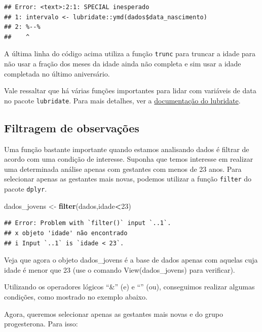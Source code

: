 \documentclass[
]{book}
\newenvironment{Shaded}{\begin{snugshade}}{\end{snugshade}}
\newcommand{\DecValTok}[1]{\textcolor[rgb]{0.00,0.00,0.81}{#1}}
\newcommand{\KeywordTok}[1]{\textcolor[rgb]{0.13,0.29,0.53}{\textbf{#1}}}
\newcommand{\NormalTok}[1]{#1}
\newcommand{\OperatorTok}[1]{\textcolor[rgb]{0.81,0.36,0.00}{\textbf{#1}}}
\newcommand{\StringTok}[1]{\textcolor[rgb]{0.31,0.60,0.02}{#1}}
\begin{document}
\begin{verbatim}
## Error: <text>:2:1: SPECIAL inesperado
## 1: intervalo <- lubridate::ymd(dados$data_nascimento) 
## 2: %--%
##    ^
\end{verbatim}

A última linha do código acima utiliza a função \texttt{trunc} para truncar a idade para não usar a fração dos meses da idade ainda não completa e sim usar a idade completada no último aniversário.

Vale ressaltar que há várias funções importantes para lidar com variáveis de data no pacote \texttt{lubridate}. Para mais detalhes, ver a \href{https://cran.r-project.org/web/packages/lubridate/vignettes/lubridate.html}{documentação do lubridate}.

\hypertarget{filtragem-de-observauxe7uxf5es}{%
\subsection{Filtragem de observações}\label{filtragem-de-observauxe7uxf5es}}

Uma função bastante importante quando estamos analisando dados é filtrar de acordo com uma condição de interesse. Suponha que temos interesse em realizar uma determinada análise apenas com gestantes com menos de 23 anos. Para selecionar apenas as gestantes mais novas, podemos utilizar a função \texttt{filter} do pacote \texttt{dplyr}.

\begin{Shaded}
\begin{Highlighting}[]
\NormalTok{dados_jovens <-}\StringTok{ }\KeywordTok{filter}\NormalTok{(dados,idade}\OperatorTok{<}\DecValTok{23}\NormalTok{)}
\end{Highlighting}
\end{Shaded}

\begin{verbatim}
## Error: Problem with `filter()` input `..1`.
## x objeto 'idade' não encontrado
## i Input `..1` is `idade < 23`.
\end{verbatim}

Veja que agora o objeto dados\_jovens é a base de dados apenas com aquelas cuja idade é menor que 23 (use o comando View(dados\_jovens) para verificar).

Utilizando os operadores lógicos ``\&'' (e) e ``\textbar{}'' (ou), conseguimos realizar algumas condições, como mostrado no exemplo abaixo.

Agora, queremos selecionar apenas as gestantes mais novas e do grupo progesterona. Para isso:
\end{document}
